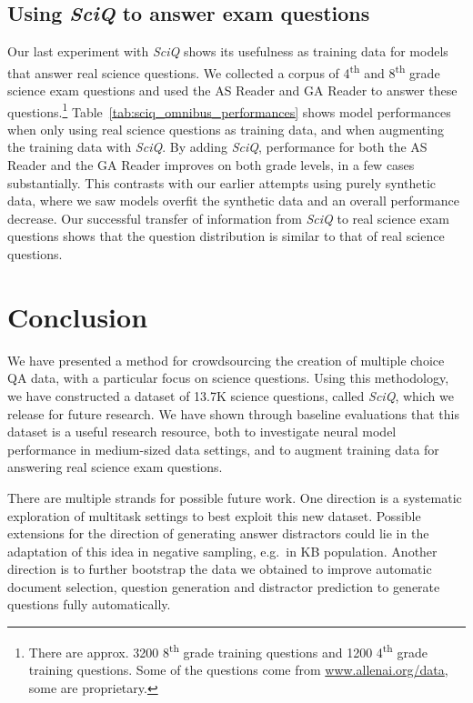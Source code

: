 \subsection{Using \emph{SciQ} to answer exam questions}

Our last experiment with \emph{SciQ} shows its usefulness as training data for models that answer real science questions.  We collected a corpus of 4\textsuperscript{th} and
8\textsuperscript{th} grade science exam questions and used the AS Reader and GA Reader to answer these questions.\footnote{There are approx. 3200 8\textsuperscript{th} grade training questions and 1200 4\textsuperscript{th} grade training questions.  Some of the questions come from
\url{www.allenai.org/data}, some are proprietary.} Table~\ref{tab:sciq_omnibus_performances} shows model performances when only using real science questions as training data, and when augmenting the training data with \emph{SciQ}.  By adding \emph{SciQ}, performance for both the AS Reader and the GA Reader improves on both grade levels, in a few cases substantially.  This contrasts with our earlier attempts using purely synthetic data, where we saw models overfit the synthetic data and an overall performance decrease.  Our successful transfer of information from \emph{SciQ} to real science exam questions shows that the question distribution is similar to that of real science questions.

\section{Conclusion}

We have presented a method for crowdsourcing the creation of multiple choice QA data, with a particular focus on science questions. Using this methodology, we have constructed a dataset of 13.7K science questions, called \emph{SciQ}, which we release for future research. We have shown through baseline evaluations that this dataset is a useful research resource, both to investigate neural model performance in medium-sized data settings, and to augment training data for answering real science exam questions.

There are multiple strands for possible future work. One direction is a systematic exploration of multitask settings to best exploit this new dataset.  Possible extensions for the direction of generating answer distractors could lie in the adaptation of this idea in negative sampling, e.g.~in KB population. Another direction is to further bootstrap the data we obtained to improve automatic document selection, question generation and distractor prediction to generate questions fully automatically.


